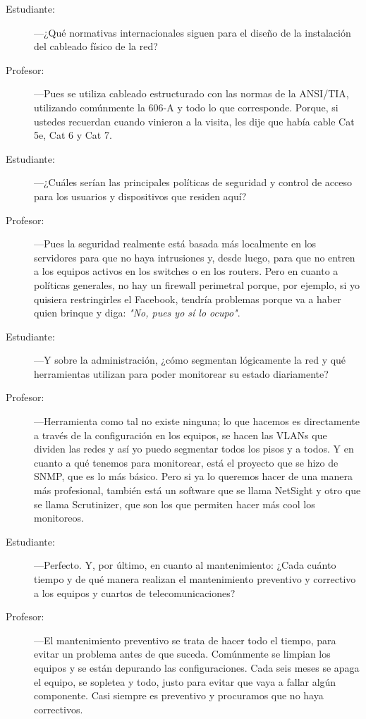 \documentclass[11pt, letterpaper]{article}
\begin{document}
\vspace{0.5cm}
\begin{tcolorbox}[enhanced, breakable, colback=GrisFondo, colframe=AzulUNAM, 
                  title=\textbf{Transcripción de la Entrevista}, arc=2mm, 
                  boxrule=1pt, attach boxed title to top left={xshift=5mm, yshift=-3mm},
                  boxed title style={colback=AzulUNAM}]
\begin{description}
    \item[\textcolor{AzulUNAM}{Estudiante:}] —¿Qué normativas internacionales siguen para el diseño de la instalación del cableado físico de la red?
    \item[\textcolor{black!70!white}{Profesor:}] —Pues se utiliza cableado estructurado con las normas de la ANSI/TIA, utilizando comúnmente la 606-A y todo lo que corresponde. Porque, si ustedes recuerdan cuando vinieron a la visita, les dije que había cable Cat 5e, Cat 6 y Cat 7.
    \item[\textcolor{AzulUNAM}{Estudiante:}] —¿Cuáles serían las principales políticas de seguridad y control de acceso para los usuarios y dispositivos que residen aquí?
    \item[\textcolor{black!70!white}{Profesor:}] —Pues la seguridad realmente está basada más localmente en los servidores para que no haya intrusiones y, desde luego, para que no entren a los equipos activos en los switches o en los routers. Pero en cuanto a políticas generales, no hay un firewall perimetral porque, por ejemplo, si yo quisiera restringirles el Facebook, tendría problemas porque va a haber quien brinque y diga: \textit{"No, pues yo sí lo ocupo"}.
    \item[\textcolor{AzulUNAM}{Estudiante:}] —Y sobre la administración, ¿cómo segmentan lógicamente la red y qué herramientas utilizan para poder monitorear su estado diariamente?
    \item[\textcolor{black!70!white}{Profesor:}] —Herramienta como tal no existe ninguna; lo que hacemos es directamente a través de la configuración en los equipos, se hacen las VLANs que dividen las redes y así yo puedo segmentar todos los pisos y a todos. Y en cuanto a qué tenemos para monitorear, está el proyecto que se hizo de SNMP, que es lo más básico. Pero si ya lo queremos hacer de una manera más profesional, también está un software que se llama NetSight y otro que se llama Scrutinizer, que son los que permiten hacer más cool los monitoreos.
    \item[\textcolor{AzulUNAM}{Estudiante:}] —Perfecto. Y, por último, en cuanto al mantenimiento: ¿Cada cuánto tiempo y de qué manera realizan el mantenimiento preventivo y correctivo a los equipos y cuartos de telecomunicaciones?
    \item[\textcolor{black!70!white}{Profesor:}] —El mantenimiento preventivo se trata de hacer todo el tiempo, para evitar un problema antes de que suceda. Comúnmente se limpian los equipos y se están depurando las configuraciones. Cada seis meses se apaga el equipo, se sopletea y todo, justo para evitar que vaya a fallar algún componente. Casi siempre es preventivo y procuramos que no haya correctivos.
\end{description}
\end{tcolorbox}
\end{document}
